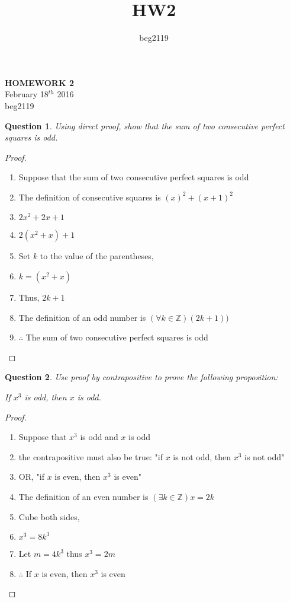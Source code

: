 \documentclass{article}
\title{HW2}
\author{beg2119}
\newtheorem{question}{Question}
\begin{document}
\begin{center}
    \textbf{HOMEWORK 2} \\
    February 18$^{th}$ 2016 \\

    beg2119
\end{center}

\bigskip

\begin{question}
    Using direct proof, show that the sum of two consecutive perfect squares is odd.
\end{question}

\begin{proof}
    \begin{enumerate}
        \item Suppose that the sum of two consecutive perfect squares is odd
        \item The definition of consecutive squares is $(x)^2 + (x+1)^2$
        \item $2x^2 + 2x + 1$
        \item $2(x^2 + x) + 1$
        \item Set $k$ to the value of the parentheses,
        \item $k=(x^2 + x)$
        \item Thus, $2k + 1$
        \item The definition of an odd number is $(\forall k \in \mathbb{Z})(2k + 1))$
        \item $\therefore$ The sum of two consecutive perfect squares is odd
    \end{enumerate}
\end{proof}

\bigskip

\begin{question}
    Use proof by contrapositive to prove the following proposition:
    \centerline{If $x^3$ is odd, then $x$ is odd.}
\end{question}

\begin{proof}
    \begin{enumerate}
        \item Suppose that $x^3$ is odd and $x$ is odd
        \item the contrapositive must also be true: "if $x$ is not odd, then $x^3$ is not odd"
        \item OR, "if $x$ is even, then $x^3$ is even"
        \item The definition of an even number is $(\exists k \in \mathbb{Z}) x = 2k$
        \item Cube both sides,
        \item $x^3 = 8k^3$
        \item Let $m = 4k^3$ thus $ x^3 = 2m$
        \item $\therefore$ If $x$ is even, then $x^3$ is even
    \end{enumerate}
\end{proof}
\end{document}
